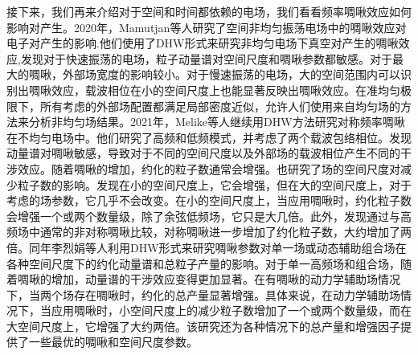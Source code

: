 接下来，我们再来介绍对于空间和时间都依赖的电场，我们看看频率啁啾效应如何影响对产生。2020年，Mamutjan等人研究了空间非均匀振荡电场中的啁啾效应对电子对产生的影响\cite{2020cm}.他们使用了DHW形式来研究非均匀电场下真空对产生的啁啾效应,发现对于快速振荡的电场，粒子动量谱对空间尺度和啁啾参数都敏感。对于最大的啁啾，外部场宽度的影响较小。对于慢速振荡的电场，大的空间范围内可以识别出啁啾效应，载波相位在小的空间尺度上也能显著反映出啁啾效应。在准均匀极限下，所有考虑的外部场配置都满足局部密度近似，允许人们使用来自均匀场的方法来分析非均匀场结果。2021年，Melike等人继续用DHW方法研究对称频率啁啾在不均匀电场中\cite{2021cMM}。他们研究了高频和低频模式，并考虑了两个载波包络相位。发现动量谱对啁啾敏感，导致对于不同的空间尺度以及外部场的载波相位产生不同的干涉效应。随着啁啾的增加，约化的粒子数通常会增强。也研究了场的空间尺度对减少粒子数的影响。发现在小的空间尺度上，它会增强，但在大的空间尺度上，对于考虑的场参数，它几乎不会改变。在小的空间尺度上，当应用啁啾时，约化粒子数会增强一个或两个数量级，除了余弦低频场，它只是大几倍。此外，发现通过与高频场中通常的非对称啁啾比较，对称啁啾进一步增加了约化粒子数，大约增加了两倍。同年李烈娟等人利用DHW形式来研究啁啾参数对单一场或动态辅助组合场在各种空间尺度下的约化动量谱和总粒子产量的影响\cite{2021cL}。对于单一高频场和组合场，随着啁啾的增加，动量谱的干涉效应变得更加显著。在有啁啾的动力学辅助场情况下，当两个场存在啁啾时，约化的总产量显著增强。具体来说，在动力学辅助场情况下，当应用啁啾时，小空间尺度上的减少粒子数增加了一个或两个数量级，而在大空间尺度上，它增强了大约两倍。该研究还为各种情况下的总产量和增强因子提供了一些最优的啁啾和空间尺度参数。

